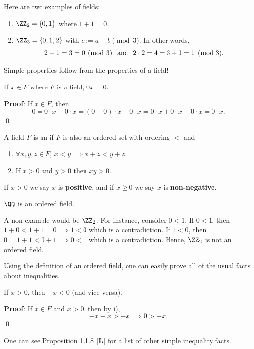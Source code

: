 \begin{example}
Here are two examples of fields:
\begin{enumerate}
    \item $\ZZ_2 = \{0,1\}$ where $1+1 = 0$.
    \item $\ZZ_3 = \{0,1,2\}$ with $c:= a+b \pmod{3}$. In other words, \[2+1=3=0\pmod 3 \hspace{.25cm} \text{and} \hspace{.25cm} 2\cdot2 = 4 = 3+1 = 1\pmod 3.\]
\end{enumerate}
\end{example}

Simple properties follow from the properties of a field!
\begin{theorem}
If $x\in F$ where $F$ is a field, $0x=0.$
\end{theorem}
\textbf{Proof}: If $x\in F$, then
\[
0 = 0\cdot x -0\cdot x = (0+0)\cdot x -0\cdot x = 0\cdot x+0\cdot x -0\cdot x = 0\cdot x.
\]
\qed 

\begin{definition}
A field $F$ is an  if $F$ is also an ordered set with ordering $<$ and 
\begin{enumerate}[label = \roman*)]
    \item $\forall x,y,z\in F$, $x<y\implies x+z<y+z$.
    \item If $x>0$ and $y>0$ then $xy>0$.
\end{enumerate}
If $x>0$ we say $x$ is \textbf{positive}, and if $x\geq 0$ we say $x$ is \textbf{non-negative}.
\end{definition}

\begin{example}
$\QQ$ is an ordered field.
\end{example}

A non-example would be $\ZZ_2$. For instance, consider $0<1$. If $0<1$, then $1+0<1+1 = 0\implies 1<0$ which is a contradiction. If $1<0$, then $0=1+1<0+1 \implies 0<1$ which is a contradiction. Hence, $\ZZ_2$ is not an ordered field.

Using the definition of an ordered field, one can easily prove all of the usual facts about inequalities.
\begin{theorem}
If $x>0$, then $-x<0$ (and vice versa).
\end{theorem}
\textbf{Proof}: If $x\in F$ and $x>0$, then by i),
\[
-x+x>-x \implies 0>-x.
\]\qed 

One can see Proposition 1.1.8 \textbf{[L]} for a list of other simple inequality facts.

